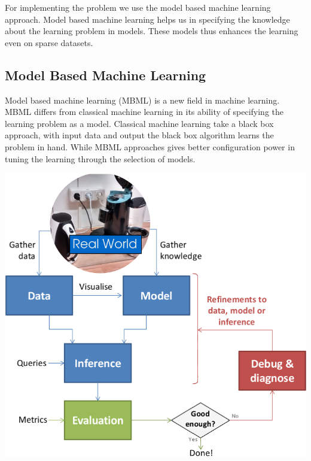 \documentclass{llncs}
\begin{document}
For implementing the problem we use the model based machine learning approach. Model based machine learning helps us in specifying the knowledge about the learning problem in models. These models thus enhances the learning even on sparse datasets.



\subsection{Model Based Machine Learning}

Model based machine learning (MBML) is a new field in machine learning. MBML differs from classical machine learning in its ability of specifying the learning problem as a model. Classical machine learning take a black box approach, with input data and output the black box algorithm learns the problem in hand. While MBML approaches gives better configuration power in tuning the learning through the selection of models.

\includegraphics[width=\textwidth]{Lifecycle.png}
\end{document}
